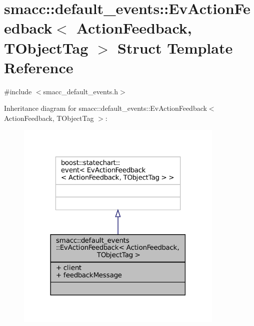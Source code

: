 \hypertarget{structsmacc_1_1default__events_1_1EvActionFeedback}{}\section{smacc\+:\+:default\+\_\+events\+:\+:Ev\+Action\+Feedback$<$ Action\+Feedback, T\+Object\+Tag $>$ Struct Template Reference}
\label{structsmacc_1_1default__events_1_1EvActionFeedback}


{\ttfamily \#include $<$smacc\+\_\+default\+\_\+events.\+h$>$}



Inheritance diagram for smacc\+:\+:default\+\_\+events\+:\+:Ev\+Action\+Feedback$<$ Action\+Feedback, T\+Object\+Tag $>$\+:
\nopagebreak
\begin{figure}[H]
\begin{center}
\leavevmode
\includegraphics[width=282pt]{structsmacc_1_1default__events_1_1EvActionFeedback__inherit__graph}
\end{center}
\end{figure}


